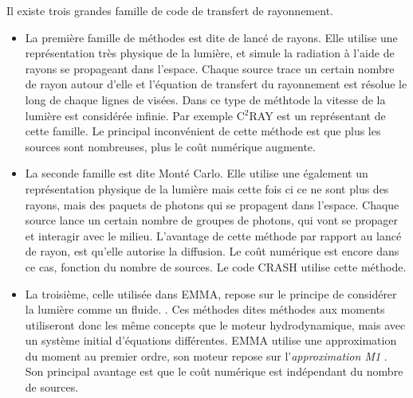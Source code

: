 Il existe trois grandes famille de code de transfert de rayonnement.
\begin{itemize}

\item La première famille de méthodes est dite de lancé de rayons.
Elle utilise une représentation très physique de la lumière, et simule la radiation à l'aide de rayons se propageant dans l'espace.
Chaque source trace un certain nombre de rayon autour d'elle et l'équation de transfert du rayonnement est résolue le long de chaque lignes de visées.
Dans ce type de méthtode la vitesse de la lumière est considérée infinie.
Par exemple C$^2$RAY\citep{2006NewA...11..374M} est un représentant de cette famille.
Le principal inconvénient de cette méthode est que plus les sources sont nombreuses, plus le coût numérique augmente.

\item La seconde famille est dite Monté Carlo.
Elle utilise une également un représentation physique de la lumière mais cette fois ci ce ne sont plus des rayons, mais des paquets de photons qui se propagent dans l'espace.
Chaque source lance un certain nombre de groupes de photons, qui vont se propager et interagir avec le milieu.
L'avantage de cette méthode par rapport au lancé de rayon, est qu'elle autorise la diffusion.
Le coût numérique est encore dans ce cas, fonction du nombre de sources.
Le code CRASH \citep{2003MNRAS.345..379M} utilise cette méthode.

\item La troisième, celle utilisée dans EMMA, repose sur le principe de considérer la lumière comme un fluide. \citep{gnedin_multi-dimensional_2001, aubert_radiative_2008}.
Ces méthodes dites méthodes aux moments utiliseront donc les même concepts que le moteur hydrodynamique, mais avec un système initial d'équations différentes. 
EMMA utilise une approximation du moment au premier ordre, son moteur repose sur l'\textit{approximation M1} \citep{levermore_relating_1984}.
Son principal avantage est que le coût numérique est indépendant du nombre de sources.
\end{itemize}


